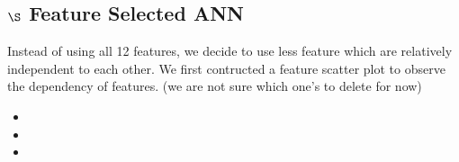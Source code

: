 \documentclass[11pt]{article}  %
\begin{document}
\subsection*{$\S$ Feature Selected ANN}
Instead of using all 12 features, we decide to use less feature which are relatively independent to each other. We first contructed a feature scatter plot to observe the dependency of features. (we are not sure which one's to delete for now)



\begin{itemize}
\item 
\item 
\item 


\end{itemize}
\end{document}
